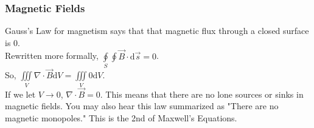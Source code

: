 \subsubsection{Magnetic Fields}
\noindent
Gauss's Law for magnetism says that that magnetic flux through a closed surface is 0.\\
Rewritten more formally, $\oint\limits_{S}\oint{\vec{B} \cdot \mathrm{d}\vec{s}} = 0$.\\
So, $\iiint\limits_{V}{\nabla \cdot \vec{B}\mathrm{d}V} = \iiint\limits_{V}{0\mathrm{d}V}$.\\
If we let $V \to 0$, $\nabla \cdot \vec{B} = 0$. This means that there are no lone sources or sinks in magnetic fields. You may also hear this law summarized as "There are no magnetic monopoles." This is the 2nd of Maxwell's Equations.
